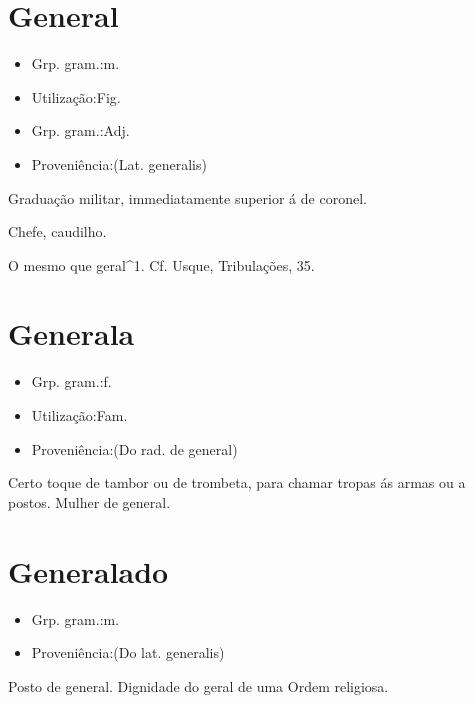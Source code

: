 \section{General}
\begin{itemize}
\item {Grp. gram.:m.}
\end{itemize}
\begin{itemize}
\item {Utilização:Fig.}
\end{itemize}
\begin{itemize}
\item {Grp. gram.:Adj.}
\end{itemize}
\begin{itemize}
\item {Proveniência:(Lat. \textunderscore generalis\textunderscore )}
\end{itemize}
Graduação militar, immediatamente superior á de coronel.

Chefe, caudilho.

O mesmo que \textunderscore geral\textunderscore ^1. Cf. Usque, \textunderscore Tribulações\textunderscore , 35.
\section{Generala}
\begin{itemize}
\item {Grp. gram.:f.}
\end{itemize}
\begin{itemize}
\item {Utilização:Fam.}
\end{itemize}
\begin{itemize}
\item {Proveniência:(Do rad. de \textunderscore general\textunderscore )}
\end{itemize}
Certo toque de tambor ou de trombeta, para chamar tropas ás armas ou a postos.
Mulher de general.
\section{Generalado}
\begin{itemize}
\item {Grp. gram.:m.}
\end{itemize}
\begin{itemize}
\item {Proveniência:(Do lat. \textunderscore generalis\textunderscore )}
\end{itemize}
Posto de general.
Dignidade do geral de uma Ordem religiosa.
